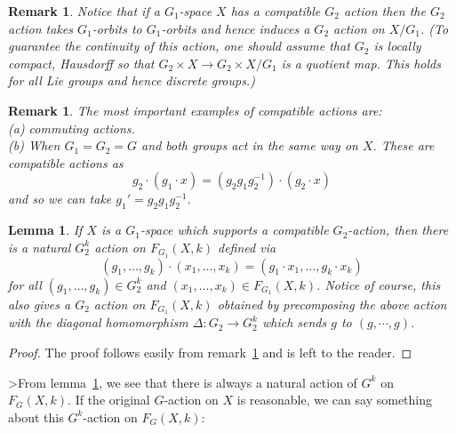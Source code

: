 \documentclass{amsart}
\newtheorem{lem}[thm]{Lemma}
\newtheorem{rem}[thm]{Remark}
\begin{document}
\begin{rem}
\label{rem: compatorbit}
Notice that if a $G_1$-space $X$ has a compatible $G_2$ action
then the $G_2$ action takes $G_1$-orbits to $G_1$-orbits
and hence induces a $G_2$ action on $X/G_1$. (To guarantee the continuity 
of this action, one should assume that $G_2$ is locally compact, Hausdorff 
so that $G_2 \times X \rightarrow G_2 \times X/G_1$ is a quotient map. This 
holds for all Lie groups and hence discrete groups.)
\end{rem}

\begin{rem}
The most important examples of compatible actions are: \\
(a) commuting actions. \\
(b) When $G_1=G_2=G$ and both groups act in the same way on $X$.
These are compatible actions as
$$
g_2 \cdot (g_1 \cdot x) = (g_2 g_1 g_2^{-1}) \cdot (g_2 \cdot x)
$$
and so we can take $g_1'=g_2 g_1 g_2^{-1}$.
\end{rem}

\begin{lem}
\label{lem: actiononorbit}
If $X$ is a $G_1$-space which supports a compatible $G_2$-action,
then there is a natural $G_2^k$ action on $F_{G_1}(X,k)$ defined via
$$
(g_1,\dots,g_k) \cdot (x_1,\dots,x_k) = (g_1\cdot x_1,\dots,g_k\cdot x_k)
$$
for all $(g_1,\dots,g_k) \in G_2^k$ and $(x_1,\dots,x_k) \in F_{G_1}(X,k)$.
Notice of course, this also gives a $G_2$ action on $F_{G_1}(X,k)$ obtained
by precomposing the above action with the diagonal homomorphism 
$\Delta : G_2 \rightarrow G_2^k$ which sends $g$ to $(g,\cdots,g)$.
\end{lem}
\begin{proof}
The proof follows easily from remark~\ref{rem: compatorbit} and
is left to the reader.
\end{proof}

>From lemma~\ref{lem: actiononorbit}, we see that there is always a natural
action of $G^k$ on $F_G(X,k)$. If the original $G$-action on $X$ is
reasonable, we can say something about this $G^k$-action on $F_G(X,k)$: 
\end{document}
